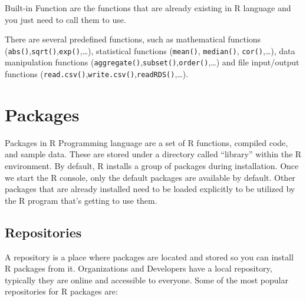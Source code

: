 \documentclass[
]{book}
\begin{document}
Built-in Function are the functions that are already existing in R language and you just need to call them to use.

There are several predefined functions, such as mathematical functions (\texttt{abs()},\texttt{sqrt()},\texttt{exp()},\ldots), statistical functions (\texttt{mean()}, \texttt{median()}, \texttt{cor()},\ldots), data manipulation functions (\texttt{aggregate()},\texttt{subset()},\texttt{order()},\ldots) and file input/output functions (\texttt{read.csv()},\texttt{write.csv()},\texttt{readRDS()},\ldots).

\hypertarget{packages}{%
\section{Packages}\label{packages}}

Packages in R Programming language are a set of R functions, compiled code, and sample data. These are stored under a directory called ``library'' within the R environment. By default, R installs a group of packages during installation. Once we start the R console, only the default packages are available by default. Other packages that are already installed need to be loaded explicitly to be utilized by the R program that's getting to use them.

\hypertarget{repositories}{%
\subsection*{Repositories}\label{repositories}}

A repository is a place where packages are located and stored so you can install R packages from it. Organizations and Developers have a local repository, typically they are online and accessible to everyone. Some of the most popular repositories for R packages are:
\end{document}
